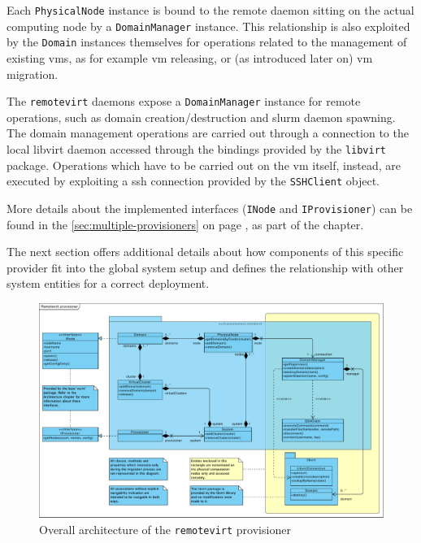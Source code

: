 Each \texttt{PhysicalNode} instance is bound to the remote daemon sitting on the actual computing node by a \texttt{DomainManager} instance. This relationship is also exploited by the \texttt{Domain} instances themselves for operations related to the management of existing \glspl{vm}, as for example \gls{vm} releasing, or (as introduced later on) \gls{vm} migration.

The \texttt{remotevirt} daemons expose a \texttt{DomainManager} instance for remote operations, such as domain creation/destruction and \gls{slurm} daemon spawning. The domain management operations are carried out through a connection to the local libvirt daemon accessed through the bindings provided by the \texttt{libvirt} package. Operations which have to be carried out on the \gls{vm} itself, instead, are executed by exploiting a \gls{ssh} connection provided by the \texttt{SSHClient} object.

More details about the implemented interfaces (\texttt{INode} and \texttt{IProvisioner}) can be found in the \autoref{sec:multiple-provisioners} on page \pageref{sec:multiple-provisioners}, as part of the \emph{} chapter.

The next section offers additional details about how components of this specific provider fit into the global system setup and defines the relationship with other system entities for a correct deployment.

\begin{landscape}
	\begin{figure}
		\centering
		\includegraphics[height=.95\textheight]{figures/remotevirt-provisioner}
		\caption{Overall architecture of the \texttt{remotevirt} provisioner}
		\label{fig:remotevirt-arch}
	\end{figure}
\end{landscape}


